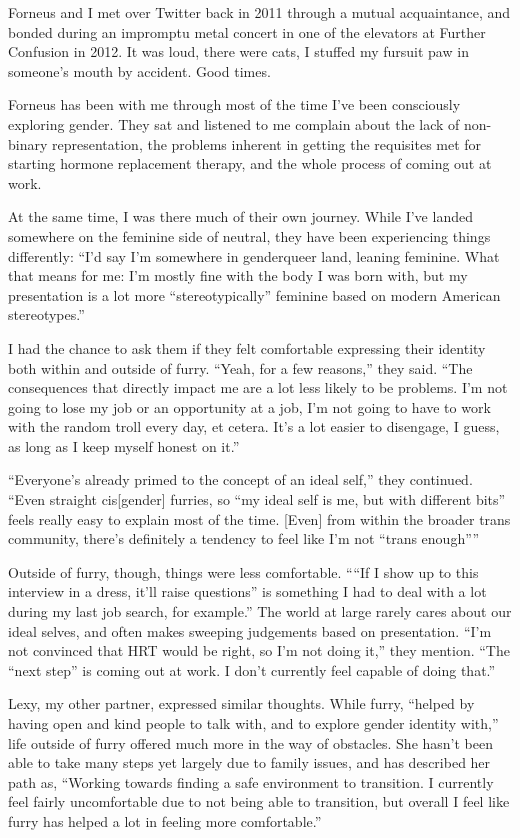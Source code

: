 Forneus and I met over Twitter back in 2011 through a mutual acquaintance, and bonded during an impromptu metal concert in one of the elevators at Further Confusion in 2012.  It was loud, there were cats, I stuffed my fursuit paw in someone's mouth by accident.  Good times.

Forneus has been with me through most of the time I've been consciously exploring gender.  They sat and listened to me complain about the lack of non-binary representation, the problems inherent in getting the requisites met for starting hormone replacement therapy, and the whole process of coming out at work.

At the same time, I was there much of their own journey.  While I've landed somewhere on the feminine side of neutral, they have been experiencing things differently: ``I’d say I’m somewhere in genderqueer land, leaning feminine. What that means for me: I’m mostly fine with the body I was born with, but my presentation is a lot more ``stereotypically'' feminine based on modern American stereotypes.''

I had the chance to ask them if they felt comfortable expressing their identity both within and outside of furry.  ``Yeah, for a few reasons,'' they said.  ``The consequences that directly impact me are a lot less likely to be problems. I’m not going to lose my job or an opportunity at a job, I’m not going to have to work with the random troll every day, et cetera.  It’s a lot easier to disengage, I guess, as long as I keep myself honest on it.''

``Everyone’s already primed to the concept of an ideal self,'' they continued. ``Even straight cis[gender] furries, so ``my ideal self is me, but with different bits'' feels really easy to explain most of the time.
[Even] from within the broader trans community, there’s definitely a tendency to feel like I’m not ``trans enough''''

Outside of furry, though, things were less comfortable.  ````If I show up to this interview in a dress, it’ll raise questions'' is something I had to deal with a lot during my last job search, for example.''  The world at large rarely cares about our ideal selves, and often makes sweeping judgements based on presentation.  ``I’m not convinced that HRT would be right, so I’m not doing it,'' they mention.  ``The ``next step'' is coming out at work. I don’t currently feel capable of doing that.''

Lexy, my other partner, expressed similar thoughts.  While furry, ``helped by having open and kind people to talk with, and to explore gender identity with,'' life outside of furry offered much more in the way of obstacles.  She hasn't been able to take many steps yet largely due to family issues, and has described her path as, ``Working towards finding a safe environment to transition.  I currently feel fairly uncomfortable due to not being able to transition, but overall I feel like furry has helped a lot in feeling more comfortable.''

